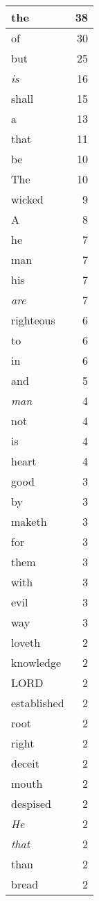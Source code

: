 \begin{center}
\begin{longtable}{l|r}
the & 38\\ \hline 
of & 30\\ \hline 
but & 25\\ \hline 
\emph{is} & 16\\ \hline 
shall & 15\\ \hline 
a & 13\\ \hline 
that & 11\\ \hline 
be & 10\\ \hline 
The & 10\\ \hline 
wicked & 9\\ \hline 
A & 8\\ \hline 
he & 7\\ \hline 
man & 7\\ \hline 
his & 7\\ \hline 
\emph{are} & 7\\ \hline 
righteous & 6\\ \hline 
to & 6\\ \hline 
in & 6\\ \hline 
and & 5\\ \hline 
\emph{man} & 4\\ \hline 
not & 4\\ \hline 
is & 4\\ \hline 
heart & 4\\ \hline 
good & 3\\ \hline 
by & 3\\ \hline 
maketh & 3\\ \hline 
for & 3\\ \hline 
them & 3\\ \hline 
with & 3\\ \hline 
evil & 3\\ \hline 
way & 3\\ \hline 
loveth & 2\\ \hline 
knowledge & 2\\ \hline 
LORD & 2\\ \hline 
established & 2\\ \hline 
root & 2\\ \hline 
right & 2\\ \hline 
deceit & 2\\ \hline 
mouth & 2\\ \hline 
despised & 2\\ \hline 
\emph{He} & 2\\ \hline 
\emph{that} & 2\\ \hline 
than & 2\\ \hline 
bread & 2\\ \hline 

\end{longtable}
\end{center}
